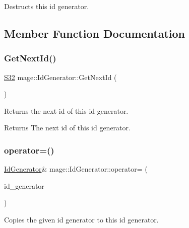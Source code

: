 Destructs this id generator. 

\subsection{Member Function Documentation}
\hypertarget{structmage_1_1_id_generator_a9e0e86e5feab919f5ac5ab4ad8f51b09}{}\label{structmage_1_1_id_generator_a9e0e86e5feab919f5ac5ab4ad8f51b09} 
\subsubsection{\texorpdfstring{Get\+Next\+Id()}{GetNextId()}}
{\footnotesize\ttfamily \hyperlink{namespacemage_a642e05c5c83642b6946703615cdbf2da}{S32} mage\+::\+Id\+Generator\+::\+Get\+Next\+Id (\begin{DoxyParamCaption}{ }\end{DoxyParamCaption})\hspace{0.3cm}{\ttfamily [noexcept]}}

Returns the next id of this id generator.

\begin{DoxyReturn}{Returns}
The next id of this id generator. 
\end{DoxyReturn}
\hypertarget{structmage_1_1_id_generator_a370c8289f38a534006e8b9ca7ec78026}{}\label{structmage_1_1_id_generator_a370c8289f38a534006e8b9ca7ec78026} 
\subsubsection{\texorpdfstring{operator=()}{operator=()}\hspace{0.1cm}{\footnotesize\ttfamily [1/2]}}
{\footnotesize\ttfamily \hyperlink{structmage_1_1_id_generator}{Id\+Generator}\& mage\+::\+Id\+Generator\+::operator= (\begin{DoxyParamCaption}\item[{const \hyperlink{structmage_1_1_id_generator}{Id\+Generator} \&}]{id\+\_\+generator }\end{DoxyParamCaption})\hspace{0.3cm}{\ttfamily [delete]}}

Copies the given id generator to this id generator.



